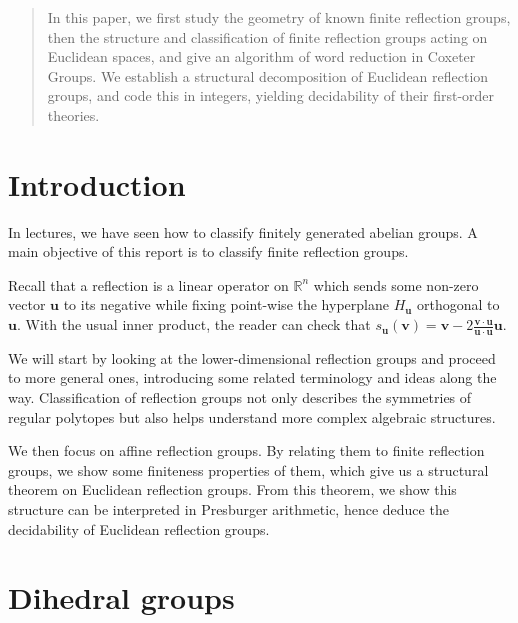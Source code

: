\documentclass[a4paper,11pt, titlepage]{article}
\begin{document}
\begin{titlepage}

\end{titlepage}

\begin{abstract}
In this paper, we first study the geometry of known finite reflection groups, then the structure and classification of finite reflection groups acting on Euclidean spaces, and give an algorithm of word reduction in Coxeter Groups. We establish a structural decomposition of Euclidean reflection groups, and code this in integers, yielding decidability of their first-order theories.
\end{abstract}

\tableofcontents
\clearpage

\section{Introduction}
In lectures, we have seen how to classify finitely generated abelian groups. A main objective of this report is to classify finite reflection groups.

Recall that a reflection is a linear operator on $\mathbb{R}^n$ which sends some non-zero vector $\mathbf{u}$ to its negative while fixing point-wise the hyperplane $H_{\mathbf{u}}$ orthogonal to $\mathbf{u}$. With the usual inner product, the reader can check that $s_{\mathbf{u}}(\mathbf{v}) = \mathbf{v} - 2\frac{\mathbf{v} \cdot \mathbf{u}}{\mathbf{u} \cdot \mathbf{u}}\mathbf{u}$.

We will start by looking at the lower-dimensional reflection groups and proceed to more general ones, introducing some related terminology and ideas along the way.
Classification of reflection groups not only describes the symmetries of regular polytopes but also helps understand more complex algebraic structures. 

We then focus on affine reflection groups. By relating them to finite reflection groups, we show some finiteness properties of them, which give us a structural theorem on Euclidean reflection groups. From this theorem, we show this structure can be interpreted in Presburger arithmetic, hence deduce the decidability of Euclidean reflection groups. 

\section{Dihedral groups}\label{section:dihedral}

\end{document}

